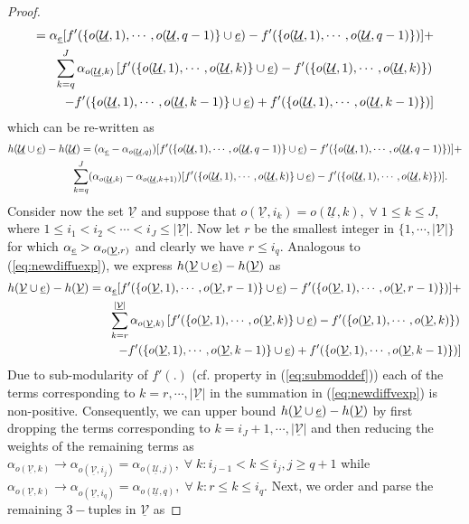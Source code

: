 \documentclass[11pt] {article}
\newcommand{\Uulc} {{\underline{\mathcal U}}}
\newcommand{\Vulc} {{\underline{\mathcal V}}}
\begin{document}
\begin{proof}
\begin{eqnarray}
  =\alpha_{\eul}[f'(\{o(\Uulc,1),\cdots,o(\Uulc,q-1)\}\cup\eul)-f'(\{o(\Uulc,1),\cdots,o(\Uulc,q-1)\})] +\\    \nonumber \sum_{k=q}^{J}\alpha_{o(\Uulc,k)}\left[f'(\{o(\Uulc,1),\cdots,o(\Uulc,k)\}\cup\eul)-f'(\{o(\Uulc,1),\cdots,o(\Uulc,k)\}) \right.\\ \left. -f'(\{o(\Uulc,1),\cdots,o(\Uulc,k-1)\}\cup\eul)  +f'(\{o(\Uulc,1),\cdots,o(\Uulc,k-1)\})\right]
 \end{eqnarray}
which can be re-written as
 \begin{eqnarray}\label{eq:newdiffu}
   \nonumber  h(\Uulc\cup\eul)- h(\Uulc)=(\alpha_{\eul}-\alpha_{o(\Uulc,q)})[f'(\{o(\Uulc,1),\cdots,o(\Uulc,q-1)\}\cup\eul)-f'(\{o(\Uulc,1),\cdots,o(\Uulc,q-1)\})] +\\     \sum_{k=q}^{J}(\alpha_{o(\Uulc,k)}-\alpha_{o(\Uulc,k+1)})[f'(\{o(\Uulc,1),\cdots,o(\Uulc,k)\}\cup\eul)-f'(\{o(\Uulc,1),\cdots,o(\Uulc,k)\})].\;\;\;\;\;
 \end{eqnarray}
Consider now the set $\Vulc$ and suppose that $o(\Vulc,i_k)=o(\Uulc,k),\;\forall\;1\leq k\leq J$, where $1\leq i_1<i_2<\cdots<i_J\leq |\Vulc|$.
Now let $r$ be the smallest integer in $\{1,\cdots,|\Vulc|\}$ for which $\alpha_{\eul}>\alpha_{o(\Vulc,r)}$ and clearly we have $r\leq i_q$.
 Analogous to (\ref{eq:newdiffuexp}), we  express  $h(\Vulc\cup\eul)- h(\Vulc)$ as
  \begin{eqnarray}\label{eq:newdiffvexp}
  \nonumber  h(\Vulc\cup\eul)- h(\Vulc)=\alpha_{\eul}[f'(\{o(\Vulc,1),\cdots,o(\Vulc,r-1)\}\cup\eul)-f'(\{o(\Vulc,1),\cdots,o(\Vulc,r-1)\})] +
   \\ \nonumber   \sum_{k=r}^{|\Vulc|}\alpha_{o(\Vulc,k)}\left[f'(\{o(\Vulc,1),\cdots,o(\Vulc,k)\}\cup\eul)-f'(\{o(\Vulc,1),\cdots,o(\Vulc,k)\}) \right.\\ \left. -f'(\{o(\Vulc,1),\cdots,o(\Vulc,k-1)\}\cup\eul)  +f'(\{o(\Vulc,1),\cdots,o(\Vulc,k-1)\})\right]
 \end{eqnarray}
Due to sub-modularity of $f'(.)$ (cf. property in (\ref{eq:submoddef})) each of the terms corresponding to $k=r,\cdots,|\Vulc|$ in the summation in (\ref{eq:newdiffvexp}) is non-positive. Consequently, we can upper bound
 $h(\Vulc\cup\eul)- h(\Vulc)$ by first dropping the terms corresponding to $k=i_J+1,\cdots,|\Vulc|$ and then reducing the weights of the remaining terms as
  $\alpha_{o(\Vulc,k)}\to \alpha_{o(\Vulc,i_j)}=\alpha_{o(\Uulc,j)},\;\forall\;k:i_{j-1}<k\leq i_j,j\geq q+1$ while $\alpha_{o(\Vulc,k)}\to \alpha_{o(\Vulc,i_q)}=\alpha_{o(\Uulc,q)},\;\forall\;k:r\leq k\leq i_q$.
 Next, we order and parse the remaining $3-$tuples in $\Vulc$ as

\end{proof}
\end{document}
